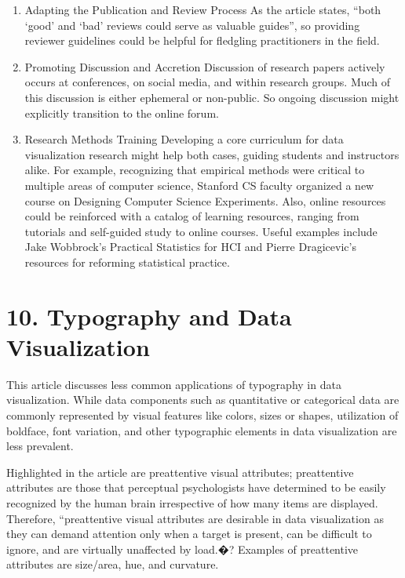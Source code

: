 \documentclass[]{book}
\theoremstyle{definition}
\theoremstyle{definition}
\theoremstyle{definition}
\theoremstyle{remark}
\begin{document}
\begin{enumerate}
\def\labelenumi{\arabic{enumi}.}
\item
  Adapting the Publication and Review Process As the article states,
  ``both `good' and `bad' reviews could serve as valuable guides'', so
  providing reviewer guidelines could be helpful for fledgling
  practitioners in the field.
\item
  Promoting Discussion and Accretion Discussion of research papers
  actively occurs at conferences, on social media, and within research
  groups. Much of this discussion is either ephemeral or non-public. So
  ongoing discussion might explicitly transition to the online forum.
\item
  Research Methods Training Developing a core curriculum for data
  visualization research might help both cases, guiding students and
  instructors alike. For example, recognizing that empirical methods
  were critical to multiple areas of computer science, Stanford CS
  faculty organized a new course on Designing Computer Science
  Experiments. Also, online resources could be reinforced with a catalog
  of learning resources, ranging from tutorials and self-guided study to
  online courses. Useful examples include Jake Wobbrock's Practical
  Statistics for HCI and Pierre Dragicevic's resources for reforming
  statistical practice.
\end{enumerate}

\section{10. Typography and Data
Visualization}\label{typography-and-data-visualization-1}

This article discusses less common applications of typography in data
visualization. While data components such as quantitative or categorical
data are commonly represented by visual features like colors, sizes or
shapes, utilization of boldface, font variation, and other typographic
elements in data visualization are less prevalent.

Highlighted in the article are preattentive visual attributes;
preattentive attributes are those that perceptual psychologists have
determined to be easily recognized by the human brain irrespective of
how many items are displayed. Therefore, ``preattentive visual
attributes are desirable in data visualization as they can demand
attention only when a target is present, can be difficult to ignore, and
are virtually unaffected by load.�? Examples of preattentive attributes
are size/area, hue, and curvature.
\end{document}
